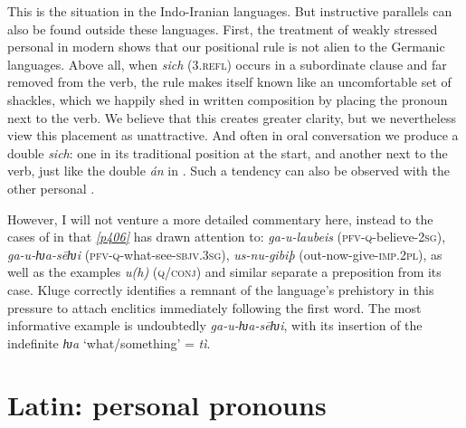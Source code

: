 This is the situation in the Indo-Iranian languages. But instructive parallels can also be found outside these languages. First, the treatment of weakly stressed personal  in modern  shows that our positional rule is not alien to the Germanic languages. Above all, when \emph{sich} (\textsc{3.refl}) occurs in a subordinate clause and far removed from the verb, the rule makes itself known like an uncomfortable set of shackles, which we happily shed in written composition by placing the pronoun next to the verb. We believe that this creates greater clarity, but we nevertheless view this placement as unattractive. And often in oral conversation we produce a double \emph{sich}: one in its traditional position at the start, and another next to the verb, just like the double \emph{án} in . Such a tendency can also be observed with the other personal .

However, I will not venture a more detailed commentary here, instead  to the cases of  in  that \citet[80]{Kluge1883} \hyperlink{p406}{\emph{[p406]}} has drawn attention to: \emph{ga-\emph{u}-laubeis} (\textsc{pfv}-\textsc{q}-believe-\textsc{2sg}), \emph{ga-\emph{u}-ƕa-sēƕi} (\textsc{pfv}-\textsc{q}-what-see-\textsc{sbjv.3sg}), \emph{us-\emph{nu}-gibiþ} (out-now-give-\textsc{imp.2pl}), as well as the examples  \emph{u(h)} (\textsc{q}/\textsc{conj}) and similar   separate a preposition from its case. Kluge correctly identifies a remnant of the language's prehistory in this pressure to attach enclitics immediately following the first word. The most informative example is undoubtedly \emph{ga-u-ƕa-sēƕi}, with its insertion of the indefinite \emph{ƕa} `what/something' =  \textit{tì}.


\section{Latin: personal pronouns}

